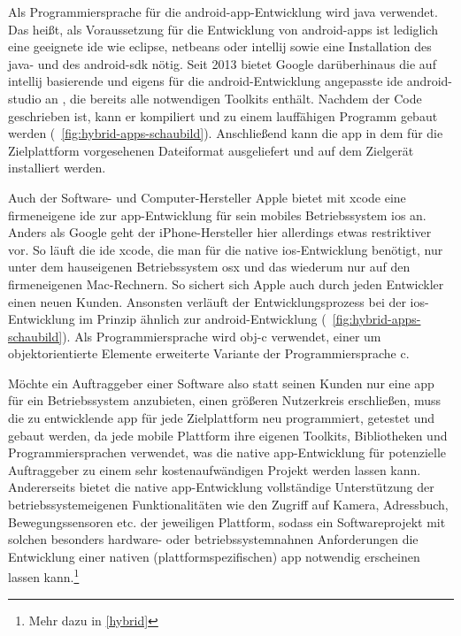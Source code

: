 Als Programmiersprache für die \gls{android}-\gls{app}-Entwicklung wird \gls{java} verwendet. Das heißt, als Voraussetzung für die Entwicklung von \gls{android}-\glspl{app} ist lediglich eine geeignete \gls{ide} wie \gls{eclipse}, \gls{netbeans} oder \gls{intellij} sowie eine Installation des \gls{java}- und des \gls{android}-\gls{sdk} nötig. 
Seit 2013 bietet Google darüberhinaus die auf \gls{intellij} basierende und eigens für die \gls{android}-Entwicklung angepasste \gls{ide} \gls{android-studio} an \cite{android-studio}, die bereits alle notwendigen Toolkits enthält. 
Nachdem der Code geschrieben ist, kann er kompiliert und zu einem lauffähigen Programm gebaut werden (\seename\ \autoref{fig:hybrid-apps-schaubild}). Anschließend kann die \gls{app} in dem für die Zielplattform vorgesehenen Dateiformat ausgeliefert und auf dem Zielgerät installiert werden.

Auch der Software- und Computer-Hersteller Apple bietet mit \gls{xcode} eine firmeneigene \gls{ide} zur \gls{app}-Entwicklung für sein mobiles Betriebssystem \gls{ios} an. Anders als Google geht der iPhone-Hersteller hier allerdings etwas restriktiver vor. So läuft die \gls{ide} \gls{xcode}, die man für die native \gls{ios}-Entwicklung benötigt, nur unter dem hauseigenen Betriebssystem \gls{osx} und das wiederum nur auf den firmeneigenen Mac-Rechnern. So sichert sich Apple auch durch jeden Entwickler einen neuen Kunden. 
Ansonsten verläuft der Entwicklungsprozess bei der \gls{ios}-Entwicklung im Prinzip ähnlich zur \gls{android}-Entwicklung (\seename\ \autoref{fig:hybrid-apps-schaubild}).
Als Programmiersprache wird \gls{obj-c} verwendet, einer um objektorientierte Elemente erweiterte Variante der Programmiersprache \gls{c}.

Möchte ein Auftraggeber einer Software also statt seinen Kunden nur eine \gls{app} für ein Betriebssystem anzubieten, einen größeren Nutzerkreis erschließen, muss die zu entwicklende \gls{app} für jede Zielplattform neu programmiert, getestet und gebaut werden, da jede mobile Plattform ihre eigenen Toolkits, Bibliotheken und Programmiersprachen verwendet, was die native \gls{app}-Entwicklung für potenzielle Auftraggeber zu einem sehr kostenaufwändigen Projekt werden lassen kann.
Andererseits bietet die native \gls{app}-Entwicklung vollständige Unterstützung der betriebssystemeigenen Funktionalitäten wie den Zugriff auf Kamera, Adressbuch, Bewegungssensoren etc. der jeweiligen Plattform, sodass ein Softwareprojekt mit solchen besonders hardware- oder betriebssystemnahnen Anforderungen die Entwicklung einer nativen (plattformspezifischen) \gls{app} notwendig erscheinen lassen kann.\footnote{Mehr dazu in \autoref{hybrid}}

